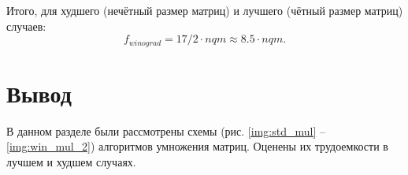 Итого, для худшего (нечётный размер матриц) и лучшего (чётный размер матриц) случаев:
\begin{equation}
\label{for:bad_2}
f_{winograd} = 17/2 \cdot nqm  \approx 8.5  \cdot nqm .
\end{equation}

\section{Вывод}

В данном разделе были рассмотрены схемы (рис. \ref{img:std_mul} -- \ref{img:win_mul_2}) алгоритмов умножения матриц.
Оценены их трудоемкости в лучшем и худшем случаях.